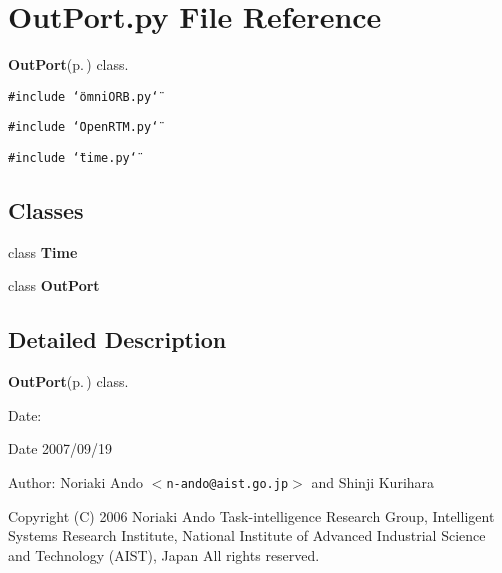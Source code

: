 \section{Out\-Port.py File Reference}
\label{OutPort_8py}
{\bf Out\-Port}{\rm (p.\,\pageref{classOutPort})} class. 

{\tt \#include \char`\"{}omni\-ORB.py\char`\"{}}\par
{\tt \#include \char`\"{}Open\-RTM.py\char`\"{}}\par
{\tt \#include \char`\"{}time.py\char`\"{}}\par
\subsection*{Classes}
\begin{CompactItemize}
\item 
class {\bf Time}
\item 
class {\bf Out\-Port}
\end{CompactItemize}


\subsection{Detailed Description}
{\bf Out\-Port}{\rm (p.\,\pageref{classOutPort})} class. 

\begin{Desc}
\item[Date:]\begin{Desc}
\item[Date]2007/09/19\end{Desc}
\end{Desc}
\begin{Desc}
\item[Author:]Noriaki Ando $<${\tt n-ando@aist.go.jp}$>$ and Shinji Kurihara\end{Desc}
Copyright (C) 2006 Noriaki Ando Task-intelligence Research Group, Intelligent Systems Research Institute, National Institute of Advanced Industrial Science and Technology (AIST), Japan All rights reserved.